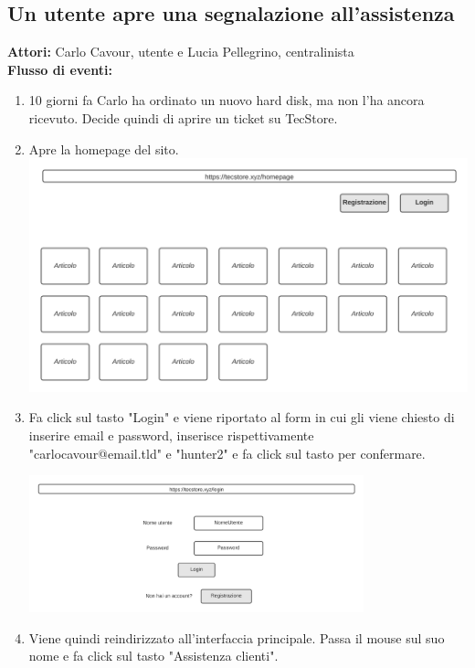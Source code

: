 \documentclass[12pt,a4paper]{article}
\begin{document}
\subsection{Un utente apre una segnalazione all'assistenza}
\textbf{Attori:} Carlo Cavour, utente e Lucia Pellegrino, centralinista \\
\noindent
\textbf{Flusso di eventi:}
\begin{enumerate}
\item 10 giorni fa Carlo ha ordinato un nuovo hard disk, ma non l'ha ancora ricevuto. Decide quindi di aprire un ticket su TecStore.

\item Apre la homepage del sito. \\

\includegraphics[width=\textwidth]{homepage}

\item Fa click sul tasto "Login" e viene riportato al form in cui gli viene chiesto di inserire email e password, inserisce rispettivamente \\ "carlocavour@email.tld" e "hunter2" e fa click sul tasto per confermare.

\includegraphics[height=150px]{login}

\newpage
\item Viene quindi reindirizzato all'interfaccia principale. Passa il mouse sul suo nome e fa click sul tasto "Assistenza clienti".


\end{enumerate}
\end{document}

